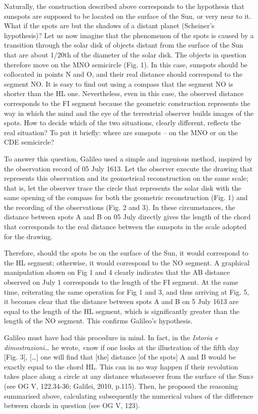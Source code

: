 \documentclass[a4paper]{article}
\begin{document}
Naturally, the construction described above corresponds to the hypothesis that sunspots are supposed to be located on
the surface of the Sun, or very near to it. What if the spots are but the shadows of a distant planet (Scheiner’s
hypothesis)? Let us now imagine that the phenomenon of the spots is caused by a transition through the solar disk of
objects distant from the surface of the Sun that are about 1/20th of the diameter of the solar disk. The objects in
question therefore move on the MNO semicircle (Fig. 1). In this case, sunspots should be collocated in points N and O,
and their real distance should correspond to the segment NO. It is easy to find out using a compass that the segment NO
is shorter than the HL one. Nevertheless, even in this case, the observed distance corresponds to the FI segment
because the geometric construction represents the way in which the mind and the eye of the terrestrial observer builds
images of the spots. How to decide which of the two situations, clearly different, reflects the real situation? To put
it briefly: where are sunspots – on the MNO or on the CDE semicircle?

To answer this question, Galileo used a simple and ingenious method, inspired by the observation record of 05 July 1613.
Let the observer execute the drawing that represents this observation and its geometrical reconstruction on the same
scale; that is, let the observer trace the circle that represents the solar disk with the same opening of the compass
for both the geometric reconstruction (Fig. 1) and the recording of the observations (Fig. 2 and 3). In these
circumstances, the distance between spots A and B on 05 July directly gives the length of the chord that corresponds to
the real distance between the sunspots in the scale adopted for the drawing. 

Therefore, should the spots be on the surface of the Sun, it would correspond to the HL segment; otherwise, it would
correspond to the NO segment. A graphical manipulation shown on Fig 1 and 4 clearly indicates that the AB distance
observed on July 1 corresponds to the length of the FI segment. At the same time, reiterating the same operation for
Fig 1 and 3, and thus arriving at Fig. 5, it becomes clear that the distance between spots A and B on 5 July 1613 are
equal to the length of the HL segment, which is significantly greater than the length of the NO segment. This confirms
Galileo’s hypothesis.

Galileo must have had this procedure in mind. In fact, in the \textit{Istoria e dimostrazioni…} he wrote, «now if one
looks at the illustration of the fifth day [Fig. 3], […] one will find that [the] distance [of the spots] A and B would
be exactly equal to the chord HL. This can in no way happen if their revolution takes place along a circle at any
distance whatsoever from the surface of the Sun» \label{ref:RNDq17wmDuX91}(see OG V, 122.34-36; Galilei, 2010, p.115).
Then, he proposed the reasoning summarised above, calculating subsequently the numerical values of the difference
between chords in question (see OG V, 123).
\end{document}

